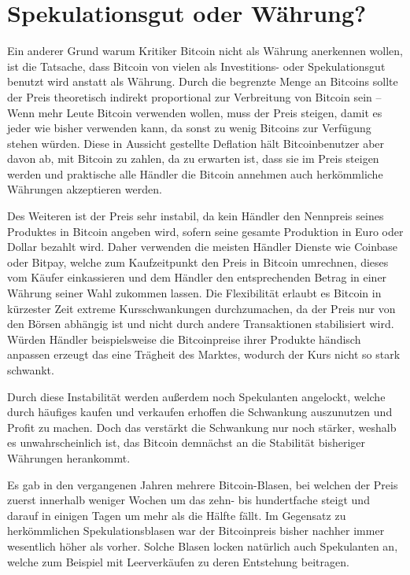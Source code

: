 \section{Spekulationsgut oder Währung?}
\label{sec:speculation}

Ein anderer Grund warum Kritiker Bitcoin nicht als Währung anerkennen wollen, ist die Tatsache, dass Bitcoin von vielen als Investitions- oder Spekulationsgut benutzt wird anstatt als Währung.
Durch die begrenzte Menge an Bitcoins sollte der Preis theoretisch indirekt proportional zur Verbreitung von Bitcoin sein -- Wenn mehr Leute Bitcoin verwenden wollen, muss der Preis steigen, damit es jeder wie bisher verwenden kann, da sonst zu wenig Bitcoins zur Verfügung stehen würden.
Diese in Aussicht gestellte Deflation hält Bitcoinbenutzer aber davon ab, mit Bitcoin zu zahlen, da zu erwarten ist, dass sie im Preis steigen werden und praktische alle Händler die Bitcoin annehmen auch herkömmliche Währungen akzeptieren werden.

Des Weiteren ist der Preis sehr instabil, da kein Händler den Nennpreis seines Produktes in Bitcoin angeben wird, sofern seine gesamte Produktion in Euro oder Dollar bezahlt wird.
Daher verwenden die meisten Händler Dienste wie Coinbase oder Bitpay, welche zum Kaufzeitpunkt den Preis in Bitcoin umrechnen, dieses vom Käufer einkassieren und dem Händler den entsprechenden Betrag in einer Währung seiner Wahl zukommen lassen.
Die Flexibilität erlaubt es Bitcoin in kürzester Zeit extreme Kursschwankungen durchzumachen, da der Preis nur von den Börsen abhängig ist und nicht durch andere Transaktionen stabilisiert wird.
Würden Händler beispielsweise die Bitcoinpreise ihrer Produkte händisch anpassen erzeugt das eine Trägheit des Marktes, wodurch der Kurs nicht so stark schwankt.

Durch diese Instabilität werden außerdem noch Spekulanten angelockt, welche durch häufiges kaufen und verkaufen erhoffen die Schwankung auszunutzen und Profit zu machen.
Doch das verstärkt die Schwankung nur noch stärker, weshalb es unwahrscheinlich ist, das Bitcoin demnächst an die Stabilität bisheriger Währungen herankommt.

Es gab in den vergangenen Jahren mehrere Bitcoin-Blasen, bei welchen der Preis zuerst innerhalb weniger Wochen um das zehn- bis hundertfache steigt und darauf in einigen Tagen um mehr als die Hälfte fällt.
Im Gegensatz zu herkömmlichen Spekulationsblasen war der Bitcoinpreis bisher nachher immer wesentlich höher als vorher.
Solche Blasen locken natürlich auch Spekulanten an, welche zum Beispiel mit Leerverkäufen zu deren Entstehung beitragen.

